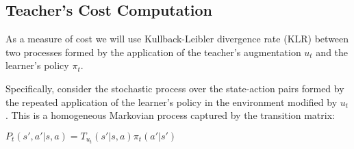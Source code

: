 \documentclass[letterpaper]{aamas2010}
\begin{document}
\subsection{Teacher's Cost Computation}
As a measure of cost we will use Kullback-Leibler divergence rate
(KLR) between two processes formed by the application of the teacher's
augmentation $u_t$ and the learner's policy $\pi_t$. 

Specifically, consider 
%
the stochastic process over the state-action pairs formed by the
repeated application of the learner's policy in the environment
modified by $u_t$. This is a homogeneous Markovian process captured 
by the transition matrix: \\ \centerline{$
  P_t(s',a'|s,a)=T_{u_t}(s'|s,a)\pi_t(a'|s') $}
\end{document}

